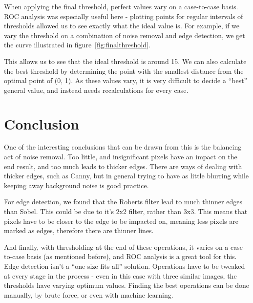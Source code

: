 \documentclass[10pt,a4paper]{article}
\begin{document}
When applying the final threshold, perfect values vary on a case-to-case basis. ROC analysis was especially useful here - plotting points for regular intervals of thresholds allowed us to see exactly what the ideal value is. For example, if we vary the threshold on a combination of noise removal and edge detection, we get the curve illustrated in figure~\ref{fig:finalthreshold}.

This allows us to see that the ideal threshold is around 15. We can also calculate the best threshold by determining the point with the smallest distance from the optimal point of (0, 1). As these values vary, it is very difficult to decide a “best” general value, and instead needs recalculations for every case.





\section*{Conclusion}
One of the interesting conclusions that can be drawn from this is the balancing act of noise removal. Too little, and insignificant pixels have an impact on the end result, and too much leads to thicker edges. There are ways of dealing with thicker edges, such as Canny, but in general trying to have as little blurring while keeping away background noise is good practice.

For edge detection, we found that the Roberts filter lead to much thinner edges than Sobel. This could be due to it’s 2x2 filter, rather than 3x3. This means that pixels have to be closer to the edge to be impacted on, meaning less pixels are marked as edges, therefore there are thinner lines.

And finally, with thresholding at the end of these operations, it varies on a case-to-case basis (as mentioned before), and ROC analysis is a great tool for this.
Edge detection isn’t a “one size fits all” solution. Operations have to be tweaked at every stage in the process - even in this case with three similar images, the thresholds have varying optimum values. Finding the best operations can be done manually, by brute force, or even with machine learning.


\end{document}
